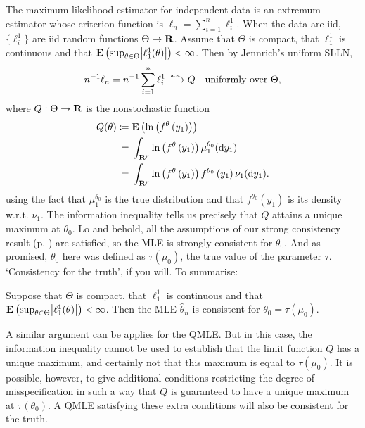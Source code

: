 \documentclass[11pt,letterpaper,reqno,oneside]{article}
\begin{document}
The maximum likelihood estimator for independent data is an extremum estimator whose criterion function is $\ell_n = \sum_{i=1}^n \ell^1_i$. When the data are iid, $\{ \ell^1_i \}$ are iid random functions $\Theta \to \mathbf{R}$. Assume that $\Theta$ is compact, that $\ell^1_1$ is continuous and that $\E\left( \sup_{\theta\in\Theta} \abs*{ \ell^1_1(\theta) } \right)<\infty$. Then by Jennrich's uniform SLLN,
%
\begin{equation*}
	n^{-1} \ell_n
	= n^{-1} \sum_{i=1}^n \ell^1_i
	\xrightarrow{{\scriptscriptstyle \mathrm{a.s.}}} Q
	\quad\text{uniformly over $\Theta$} ,
\end{equation*}
%
where $Q : \Theta \to \mathbf{R}$ is the nonstochastic function
%
\begin{align*}
	Q(\theta) 
	\coloneqq{}& 
	\mathbf{E}\left( \ln\left( f^\theta \left( y_1 \right) \right) \right)
	\\
	={}& 
	\int_{\mathbf{R}^r} \ln\left( f^\theta \left( y_1 \right) \right) \mu_1^{\theta_0}(\mathrm{d} y_1)
	\\
	={}& 
	\int_{\mathbf{R}^r} \ln\left( f^\theta \left( y_1 \right) \right) 
	f^{\theta_0} \left( y_1 \right)
	\nu_1(\mathrm{d} y_1) .
\end{align*}
%
using the fact that $\mu_1^{\theta_0}$ is the true distribution and that $f^{\theta_0} \left( y_1 \right)$ is its density w.r.t. $\nu_1$. The information inequality tells us precisely that $Q$ attains a unique maximum at $\theta_0$. Lo and behold, all the assumptions of our strong consistency result (p. \pageref{proposition:strong_consistency}) are satisfied, so the MLE is strongly consistent for $\theta_0$. And as promised, $\theta_0$ here was defined as $\tau(\mu_0)$, the true value of the parameter $\tau$. `Consistency for the truth', if you will. To summarise:
%
\begin{proposition}
	Suppose that $\Theta$ is compact, that $\ell^1_1$ is continuous and that $\E\left( \sup_{\theta\in\Theta} \abs*{ \ell^1_1(\theta) } \right) < \infty$. Then the MLE $\widehat{\theta}_n$ is consistent for $\theta_0 = \tau(\mu_0)$.
\end{proposition}


A similar argument can be applies for the QMLE. But in this case, the information inequality cannot be used to establish that the limit function $Q$ has a unique maximum, and certainly not that this maximum is equal to $\tau(\mu_0)$. It is possible, however, to give additional conditions restricting the degree of misspecification in such a way that $Q$ is guaranteed to have a unique maximum at $\tau(\theta_0)$. A QMLE satisfying these extra conditions will also be consistent for the truth.
\end{document}
